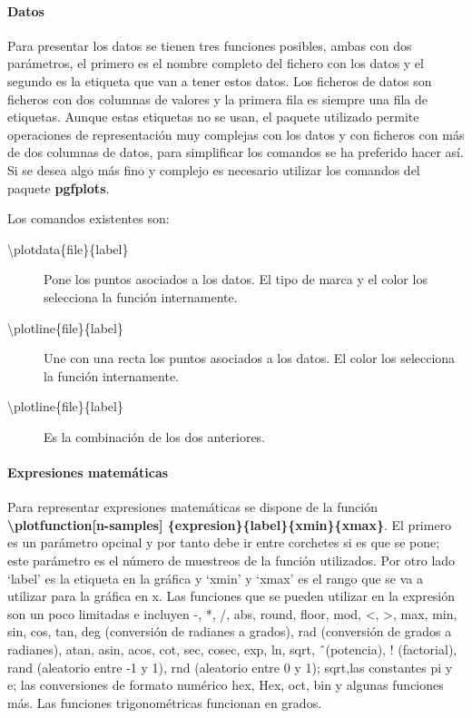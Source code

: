 \paragraph{Datos}

Para presentar los datos se tienen tres funciones posibles, ambas con dos parámetros, el primero es el nombre completo del fichero con los datos y el segundo es la etiqueta que van a tener estos datos. Los ficheros de datos son ficheros con dos columnas de valores y la primera fila es siempre una fila de etiquetas. Aunque estas etiquetas no se usan, el paquete utilizado permite operaciones de representación muy complejas con los datos y con ficheros con más de dos columnas de datos, para simplificar los comandos se ha preferido hacer así. Si se desea algo más fino y complejo es necesario utilizar los comandos del paquete \textbf{pgfplots}.

Los comandos existentes son:
\begin{description}
  \item [\textbackslash plotdata\{file\}\{label\}] Pone los puntos asociados a los datos. El tipo de marca y el color los selecciona la función internamente.
  \item [\textbackslash plotline\{file\}\{label\}] Une con una recta los puntos asociados a los datos. El color los selecciona la función internamente.
  \item [\textbackslash plotline\{file\}\{label\}] Es la combinación de los dos anteriores.
  \end{description}

\paragraph{Expresiones matemáticas}

Para representar expresiones matemáticas se dispone de la función \textbf{\textbackslash plotfunction{[n-samples]} \{expresion\}\{label\}\{xmin\}\{xmax\}}. El primero es un parámetro opcinal y por tanto debe ir entre corchetes si es que se pone; este parámetro es el número de muestreos de la función utilizados. Por otro lado `label' es la etiqueta en la gráfica y `xmin' y `xmax' es el rango que se va a utilizar para la gráfica en x. Las funciones que se pueden utilizar en la expresión son un poco limitadas e incluyen -, *, /, abs, round, floor, mod, <, >, max, min, sin, cos, tan, deg (conversión de radianes a grados), rad (conversión de grados a radianes), atan, asin, acos, cot, sec, cosec, exp, ln, sqrt, \^\  (potencia), ! (factorial), rand (aleatorio entre -1 y 1), rnd (aleatorio entre 0 y 1); sqrt,las constantes pi y e; las conversiones de formato numérico hex, Hex, oct, bin y algunas funciones más. Las funciones trigonométricas funcionan en grados.

